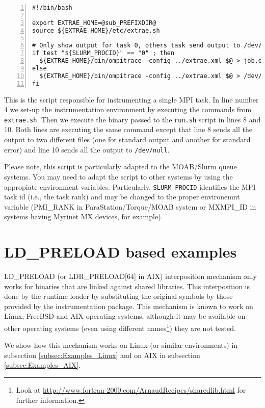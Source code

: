 \begin{Verbatim}[frame=single,numbers=left,labelposition=topline,label=run.sh]
#!/bin/bash

export EXTRAE_HOME=@sub_PREFIXDIR@
source ${EXTRAE_HOME}/etc/extrae.sh

# Only show output for task 0, others task send output to /dev/null
if test "${SLURM_PROCID}" == "0" ; then
  ${EXTRAE_HOME}/bin/ompitrace -config ../extrae.xml $@ > job.out 2> job.err
else
  ${EXTRAE_HOME}/bin/ompitrace -config ../extrae.xml $@ > /dev/null 2> /dev/null
fi
\end{Verbatim}

This is the script responsible for instrumenting a single MPI task. In line number 4 we set-up the instrumentation environment by executing the commands from {\tt extrae.sh}. Then we execute the binary passed to the {\tt run.sh} script in lines 8 and 10. Both lines are executing the same command except that line 8 sends all the output to two different files (one for standard output and another for standard error) and line 10 sends all the output to {\tt /dev/null}.

Please note, this script is particularly adapted to the MOAB/Slurm queue systems. You may need to adapt the script to other systems by using the appropiate environment variables. Particularly, {\tt SLURM\_PROCID} identifies the MPI task id (i.e., the task rank) and may be changed to the proper environemnt variable (PMI\_RANK in ParaStation/Torque/MOAB system or MXMPI\_ID in systems having Myrinet MX devices, for example).

\section{LD\_PRELOAD based examples}\label{sec:Examples_LDPRELOAD}

LD\_PRELOAD (or LDR\_PRELOAD[64] in AIX) interposition mechanism only works for binaries that are linked against shared libraries. This interposition is done by the runtime loader by substituting the original symbols by those provided by the instrumentation package. This mechanism is known to work on Linux, FreeBSD and AIX operating systems, although it may be available on other operating systems (even using different names\footnote{Look at \url{http://www.fortran-2000.com/ArnaudRecipes/sharedlib.html} for further information.}) they are not tested.

We show how this mechanism works on Linux (or similar environments) in subsection \ref{subsec:Examples_Linux} and on AIX in subsection \ref{subsec:Examples_AIX}.

